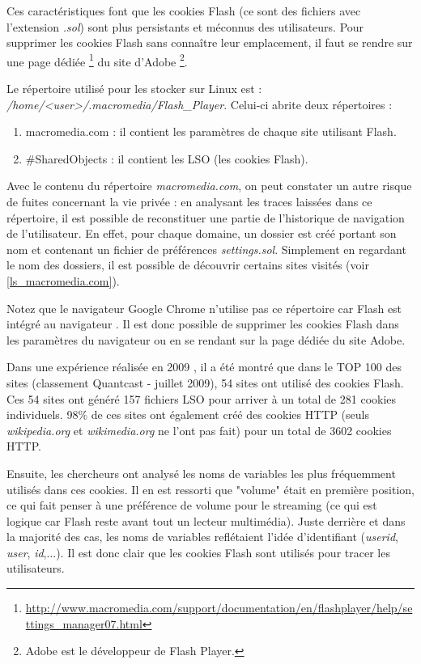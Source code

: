 Ces caractéristiques font que les cookies Flash (ce sont des fichiers avec l'extension \textit{.sol}) sont plus persistants et méconnus des utilisateurs. Pour supprimer les cookies Flash sans connaître leur emplacement, il faut se rendre sur une page dédiée \footnote{\url{http://www.macromedia.com/support/documentation/en/flashplayer/help/settings_manager07.html}} du site d'Adobe \footnote{Adobe est le développeur de Flash Player.}.
\newline

Le répertoire utilisé pour les stocker sur Linux est :\\
\mbox{\textit{/home/<user>/.macromedia/Flash\_Player}}. Celui-ci abrite deux répertoires :
\begin{enumerate}
  \item macromedia.com : il contient les paramètres de chaque site utilisant Flash.
  \item \#SharedObjects : il contient les LSO (les cookies Flash).
\end{enumerate}

Avec le contenu du répertoire \textit{macromedia.com}, on peut constater un autre risque de fuites concernant la vie privée : en analysant les traces laissées dans ce répertoire, il est possible de reconstituer une partie de l'historique de navigation de l'utilisateur. En effet, pour chaque domaine, un dossier est créé portant son nom et contenant un fichier de préférences \textit{settings.sol}. Simplement en regardant le nom des dossiers, il est possible de découvrir certains sites visités (voir \autoref{ls_macromedia.com}).

Notez que le navigateur Google Chrome n'utilise pas ce répertoire car Flash est intégré au navigateur \cite{flash_chrome}. Il est donc possible de supprimer les cookies Flash dans les paramètres du navigateur ou en se rendant sur la page dédiée du site Adobe.
\newline

Dans une expérience réalisée en 2009 \cite{conf/aaaiss/SoltaniCMTH10}, il a été montré que dans le TOP 100 des sites (classement Quantcast - juillet 2009), 54 sites ont utilisé des cookies Flash. Ces 54 sites ont généré 157 fichiers LSO pour arriver à un total de 281 cookies individuels. 98\% de ces sites ont également créé des cookies HTTP (seuls \textit{wikipedia.org} et \textit{wikimedia.org} ne l'ont pas fait) pour un total de 3602 cookies HTTP.

Ensuite, les chercheurs ont analysé les noms de variables les plus fréquemment utilisés dans ces cookies. Il en est ressorti que "volume" était en première position, ce qui fait penser à une préférence de volume pour le streaming (ce qui est logique car Flash reste avant tout un lecteur multimédia). Juste derrière et dans la majorité des cas, les noms de variables reflétaient l'idée d'identifiant (\textit{userid}, \textit{user}, \textit{id},...). Il est donc clair que les cookies Flash sont utilisés pour tracer les utilisateurs.

